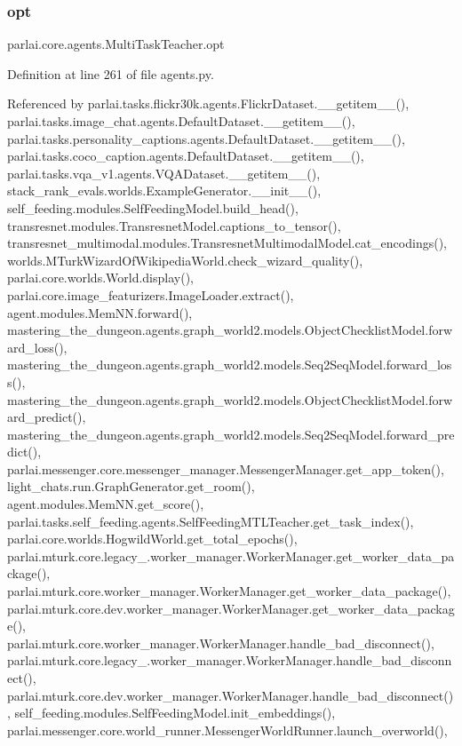 \subsubsection{\texorpdfstring{opt}{opt}}
{\footnotesize\ttfamily parlai.\+core.\+agents.\+Multi\+Task\+Teacher.\+opt}



Definition at line 261 of file agents.\+py.



Referenced by parlai.\+tasks.\+flickr30k.\+agents.\+Flickr\+Dataset.\+\_\+\+\_\+getitem\+\_\+\+\_\+(), parlai.\+tasks.\+image\+\_\+chat.\+agents.\+Default\+Dataset.\+\_\+\+\_\+getitem\+\_\+\+\_\+(), parlai.\+tasks.\+personality\+\_\+captions.\+agents.\+Default\+Dataset.\+\_\+\+\_\+getitem\+\_\+\+\_\+(), parlai.\+tasks.\+coco\+\_\+caption.\+agents.\+Default\+Dataset.\+\_\+\+\_\+getitem\+\_\+\+\_\+(), parlai.\+tasks.\+vqa\+\_\+v1.\+agents.\+V\+Q\+A\+Dataset.\+\_\+\+\_\+getitem\+\_\+\+\_\+(), stack\+\_\+rank\+\_\+evals.\+worlds.\+Example\+Generator.\+\_\+\+\_\+init\+\_\+\+\_\+(), self\+\_\+feeding.\+modules.\+Self\+Feeding\+Model.\+build\+\_\+head(), transresnet.\+modules.\+Transresnet\+Model.\+captions\+\_\+to\+\_\+tensor(), transresnet\+\_\+multimodal.\+modules.\+Transresnet\+Multimodal\+Model.\+cat\+\_\+encodings(), worlds.\+M\+Turk\+Wizard\+Of\+Wikipedia\+World.\+check\+\_\+wizard\+\_\+quality(), parlai.\+core.\+worlds.\+World.\+display(), parlai.\+core.\+image\+\_\+featurizers.\+Image\+Loader.\+extract(), agent.\+modules.\+Mem\+N\+N.\+forward(), mastering\+\_\+the\+\_\+dungeon.\+agents.\+graph\+\_\+world2.\+models.\+Object\+Checklist\+Model.\+forward\+\_\+loss(), mastering\+\_\+the\+\_\+dungeon.\+agents.\+graph\+\_\+world2.\+models.\+Seq2\+Seq\+Model.\+forward\+\_\+loss(), mastering\+\_\+the\+\_\+dungeon.\+agents.\+graph\+\_\+world2.\+models.\+Object\+Checklist\+Model.\+forward\+\_\+predict(), mastering\+\_\+the\+\_\+dungeon.\+agents.\+graph\+\_\+world2.\+models.\+Seq2\+Seq\+Model.\+forward\+\_\+predict(), parlai.\+messenger.\+core.\+messenger\+\_\+manager.\+Messenger\+Manager.\+get\+\_\+app\+\_\+token(), light\+\_\+chats.\+run.\+Graph\+Generator.\+get\+\_\+room(), agent.\+modules.\+Mem\+N\+N.\+get\+\_\+score(), parlai.\+tasks.\+self\+\_\+feeding.\+agents.\+Self\+Feeding\+M\+T\+L\+Teacher.\+get\+\_\+task\+\_\+index(), parlai.\+core.\+worlds.\+Hogwild\+World.\+get\+\_\+total\+\_\+epochs(), parlai.\+mturk.\+core.\+legacy\+\_.\+worker\+\_\+manager.\+Worker\+Manager.\+get\+\_\+worker\+\_\+data\+\_\+package(), parlai.\+mturk.\+core.\+worker\+\_\+manager.\+Worker\+Manager.\+get\+\_\+worker\+\_\+data\+\_\+package(), parlai.\+mturk.\+core.\+dev.\+worker\+\_\+manager.\+Worker\+Manager.\+get\+\_\+worker\+\_\+data\+\_\+package(), parlai.\+mturk.\+core.\+worker\+\_\+manager.\+Worker\+Manager.\+handle\+\_\+bad\+\_\+disconnect(), parlai.\+mturk.\+core.\+legacy\+\_.\+worker\+\_\+manager.\+Worker\+Manager.\+handle\+\_\+bad\+\_\+disconnect(), parlai.\+mturk.\+core.\+dev.\+worker\+\_\+manager.\+Worker\+Manager.\+handle\+\_\+bad\+\_\+disconnect(), self\+\_\+feeding.\+modules.\+Self\+Feeding\+Model.\+init\+\_\+embeddings(), parlai.\+messenger.\+core.\+world\+\_\+runner.\+Messenger\+World\+Runner.\+launch\+\_\+overworld(), 